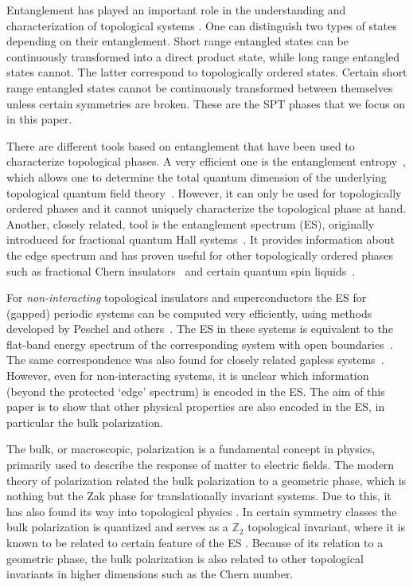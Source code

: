 \documentclass[twocolumn,amsmath,longbibliography,amssymb,superscriptaddress]{revtex4-1}
\begin{document}
Entanglement has played an important role in the understanding and characterization of topological systems \cite{Ludwig2015,Wen2017}. One can distinguish two types of states depending on their entanglement. Short range entangled states can be continuously transformed into a direct product state, while long range entangled states cannot. The latter correspond to topologically ordered states. Certain short range entangled states cannot be continuously transformed between themselves unless certain symmetries are broken. These are the SPT phases that we focus on in this paper. 

There are different tools based on entanglement that have been used to characterize topological phases. A very efficient one is the entanglement entropy~\cite{srednicki1993entropy}, which allows one to determine the total quantum dimension of the underlying topological quantum field theory~\cite{Kitaev2006topological, Levin2006detecting}. However, it can only be used for topologically ordered phases and it cannot uniquely characterize the topological phase at hand.
Another, closely related, tool is the entanglement spectrum (ES), originally introduced for fractional quantum Hall systems~\cite{Li2008entanglement}. It provides information about the edge spectrum and has proven useful for other topologically ordered phases such as fractional Chern insulators~\cite{Regnault2011fractional} and certain quantum spin liquids~\cite{yao2010entanglement}.

For \emph{non-interacting} topological insulators  and superconductors the ES for (gapped) periodic systems can be computed very efficiently, using methods developed by Peschel and others~\cite{Peschel2003}. The ES in these systems is equivalent to the flat-band energy spectrum of the corresponding system with open boundaries~\cite{Fidkowski2010entanglement}. The same correspondence was also found for closely related gapless systems~\cite{Matern2018entanglement}. However, even for non-interacting systems, it is unclear which information (beyond the protected `edge' spectrum) is encoded in the ES. The aim of this paper is to show that other physical properties are also encoded in the ES, in particular the bulk polarization.

The bulk, or macroscopic, polarization is a fundamental concept in physics, primarily used to describe the response of matter to electric fields. The modern theory of polarization \cite{Resta1992,KingSmith1993,Vanderbilt1993,Resta1997} related the bulk polarization to a geometric phase, which is nothing but the Zak phase for translationally invariant systems.  Due to this, it has also found its way into topological physics \cite{Kudin2007}. In certain symmetry classes the bulk polarization is quantized and serves as a $\mathbb{Z}_2$ topological invariant, where it is known to be related to certain feature of the ES \cite{Ryu2006}. Because of its relation to a geometric phase, the bulk polarization is also related to other topological invariants in higher dimensions such as the Chern number.
\end{document}
